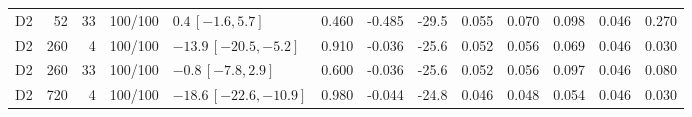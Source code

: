 \begin{longtable}{crrcp{33mm}rrrrrrrr}
D2 & 52 & 33 & 100/100 & \(0.4\,[-1.6,5.7]\) & 0.460 & -0.485 & -29.5 & 0.055 & 0.070 & 0.098 & 0.046 & 0.270\\
D2 & 260 & 4 & 100/100 & \(-13.9\,[-20.5,-5.2]\) & 0.910 & -0.036 & -25.6 & 0.052 & 0.056 & 0.069 & 0.046 & 0.030\\
D2 & 260 & 33 & 100/100 & \(-0.8\,[-7.8,2.9]\) & 0.600 & -0.036 & -25.6 & 0.052 & 0.056 & 0.097 & 0.046 & 0.080\\
D2 & 720 & 4 & 100/100 & \(-18.6\,[-22.6,-10.9]\) & 0.980 & -0.044 & -24.8 & 0.046 & 0.048 & 0.054 & 0.046 & 0.030\\

\end{longtable}
